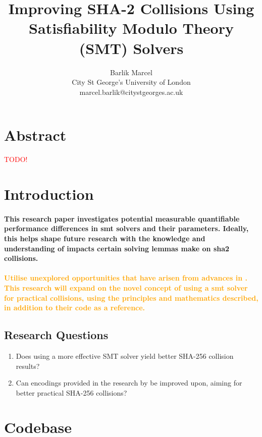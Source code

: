 \documentclass[a4paper]{report}
\title{\textbf{Improving SHA-2 Collisions Using Satisfiability Modulo Theory (SMT) Solvers}}
\author{Barlik Marcel \\ City St George's University of London \\ marcel.barlik@citystgeorges.ac.uk}
\begin{document}
\maketitle


\section{Abstract}
\textcolor{red}{TODO!}


\tableofcontents
\setcounter{tocdepth}{3}


\section{Introduction}
\paragraph{
    This research paper investigates potential measurable quantifiable performance differences in \gls{smt} solvers and their parameters.
    Ideally, this helps shape future research with the knowledge and understanding of impacts certain solving lemmas make on \gls{sha2} collisions.
}

\paragraph{
    \textcolor{orange}{Utilise unexplored opportunities that have arisen from advances in \cite{y_et_al_2024}. This research will expand on the novel concept of using a \gls{smt} solver for practical \gls{collision}s, using the principles and mathematics described, in addition to their code as a reference.}
}

\subsection{Research Questions}
\begin{center}
  \begin{enumerate}
      \item Does using a more effective SMT solver yield better SHA-256 collision results?
    \item Can encodings provided in the research by \cite{y_et_al_2024} be improved upon, aiming for better practical SHA-256 collisions?
  \end{enumerate}
\end{center}


\section{Codebase}
\end{document}
